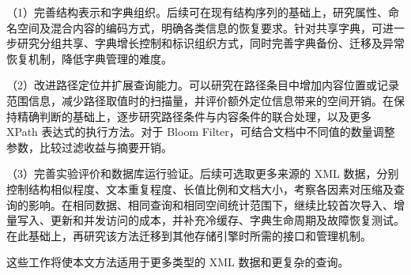 （1）完善结构表示和字典组织。后续可在现有结构序列的基础上，研究属性、命名空间及混合内容的编码方式，明确各类信息的恢复要求。针对共享字典，可进一步研究分组共享、字典增长控制和标识组织方式，同时完善字典备份、迁移及异常恢复机制，降低字典管理的难度。

（2）改进路径定位并扩展查询能力。可以研究在路径条目中增加内容位置或记录范围信息，减少路径取值时的扫描量，并评价额外定位信息带来的空间开销。在保持精确判断的基础上，逐步研究路径条件与内容条件的联合处理，以及更多 XPath 表达式的执行方法。对于 Bloom Filter，可结合文档中不同值的数量调整参数，比较过滤收益与摘要开销。

（3）完善实验评价和数据库运行验证。后续可选取更多来源的 XML 数据，分别控制结构相似程度、文本重复程度、长值比例和文档大小，考察各因素对压缩及查询的影响。在相同数据、相同查询和相同空间统计范围下，继续比较首次导入、增量写入、更新和并发访问的成本，并补充冷缓存、字典生命周期及故障恢复测试。在此基础上，再研究该方法迁移到其他存储引擎时所需的接口和管理机制。

这些工作将使本文方法适用于更多类型的 XML 数据和更复杂的查询。
